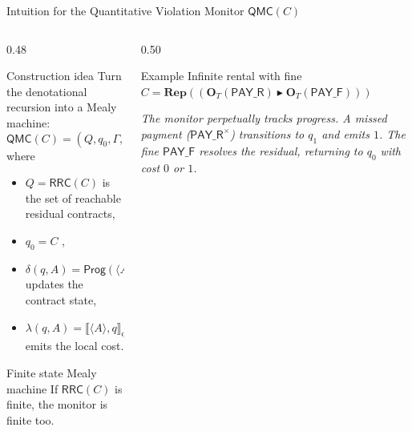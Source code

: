 \documentclass[9pt,aspectratio=169]{beamer}
\newcommand{\Prog}{\ensuremath{\mathsf{Prog}}\xspace}
\newcommand{\repair}{\ensuremath{\blacktriangleright}}
\newcommand{\obl}[2][]{\mathbf{O}_{#1}(#2)}
\newcommand{\repit}[1]{\mathbf{Rep}(#1)}
\newcommand{\trace}[1]{\ensuremath{\langle #1 \rangle}\xspace}
\newcommand{\qsem}[1]{\llbracket #1 \rrbracket_{\text{qviol}}}
\newcommand{\qmc}{\ensuremath{\mathsf{QMC}}}
\newcommand{\rrcs}[1]{\ensuremath{\mathsf{RRC}\!\left(#1\right)}\xspace}
\newcommand{\PAY}{\ensuremath{\mathsf{PAY\_R}}\xspace}
\newcommand{\PAYF}{\ensuremath{\mathsf{PAY\_F}}\xspace}
\begin{document}
\begin{frame}{Intuition for the Quantitative Violation Monitor $\qmc(C)$}
\footnotesize
\begin{columns}
\begin{column}{0.48\textwidth}
  \begin{block}{Construction idea}
    Turn the denotational recursion into a Mealy machine:
    \[
    \qmc(C)=(Q,q_0,\Gamma,\delta,\lambda)
    \]
    where
    \begin{itemize}
      \item $Q=\rrcs{C}$ is the set of reachable residual contracts,
      \item $q_0=C$ ,
      \item $\delta(q,A)=\Prog(\trace{A},q)$ updates the contract state,
      \item $\lambda(q,A)=\qsem{\trace{A},q}$ emits the local cost.
    \end{itemize}
  \end{block}

  \begin{block}{Finite state Mealy machine} 
    If $\rrcs{C}$ is finite, the monitor is finite too.
  \end{block}
\end{column}
\begin{column}{0.50\textwidth}
  
  \begin{block}{Example}
Infinite rental with fine \\$C = \repit{ (\obl[T]{\PAY} \repair \obl[T]{\PAYF}) }$

  \vspace{3mm}
  \centering

  \vspace{3mm}
  \raggedright
  \emph{The monitor perpetually tracks progress. A missed payment ($\PAY^\times$) transitions to $q_1$ and emits $1$. The fine $\PAYF$ resolves the residual, returning to $q_0$ with cost $0$ or $1$.}
  \end{block}
 
  
\end{column}
\end{columns}
\end{frame}
\end{document}
